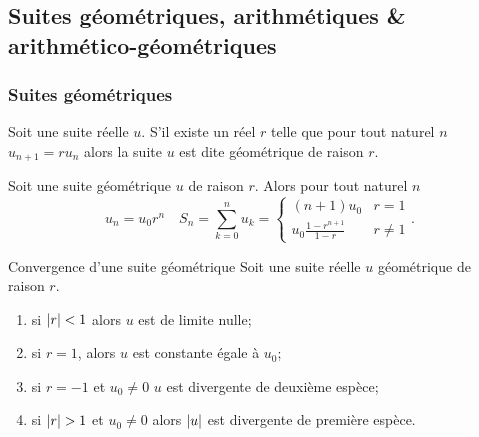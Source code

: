 \subsection{Suites géométriques, arithmétiques \& arithmético-géo\-métriques}

\subsubsection{Suites géométriques}

\begin{defdef}
  Soit une suite réelle \(u\). S'il existe un réel \(r\) telle que pour tout naturel \(n\) \(u_{n+1}=r u_n\) alors la suite \(u\) est dite géométrique de raison \(r\).
\end{defdef}
\begin{prop}
  Soit une suite géométrique \(u\) de raison \(r\). Alors pour tout naturel \(n\)
  \begin{equation}
    u_n = u_0 r^n \quad S_n=\sum_{k=0}^n u_k = \begin{cases} (n+1) u_0 & r=1 \\ u_0 \frac{1-r^{n+1}}{1-r} & r \neq 1 \end{cases}.
  \end{equation}
\end{prop}
\begin{prop}{Convergence d'une suite géométrique}
  Soit une suite réelle \(u\) géométrique de raison \(r\).
  \begin{enumerate}
  \item si \(\left\lvert r\right\rvert < 1\) alors \(u\) est de limite nulle;
  \item si \(r=1\), alors \(u\) est constante égale à \(u_0\);
  \item si \(r=-1\) et \(u_0 \neq 0\) \(u\) est divergente de deuxième espèce;
  \item si \(\left\lvert r\right\rvert>1\) et \(u_0 \neq 0\) alors \(\left\lvert u\right\rvert\) est divergente de première espèce.
  \end{enumerate}
\end{prop}

